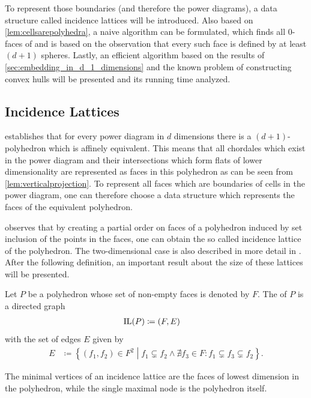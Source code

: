 To represent those boundaries (and therefore the power diagrams), a data structure called incidence lattices will be introduced.
Also based on \cref{lem:cellsarepolyhedra}, a naive algorithm can be formulated, which finds all $0$-faces of and is based on the observation that every such face is defined by at least $(d+1)$ spheres.
Lastly, an efficient algorithm based on the results of \cref{sec:embedding_in_d_1_dimensions} and the known problem of constructing convex hulls will be presented and its running time analyzed.

\subsection{Incidence Lattices}
\label{sub:incidence_lattices}
 establishes that for every power diagram in $d$ dimensions there is a $(d+1)$-polyhedron which is affinely equivalent.
This means that all chordales which exist in the power diagram and their intersections which form flats of lower dimensionality are represented as faces in this polyhedron as can be seen from \cref{lem:verticalprojection}.
To represent all faces which are boundaries of cells in the power diagram, one can therefore choose a data structure which represents the faces of the equivalent polyhedron.

\Textcite{grunbaum2003convex} observes that by creating a partial order on faces of a polyhedron induced by set inclusion of the points in the faces, one can obtain the so called incidence lattice of the polyhedron.
The two-dimensional case is also described in more detail in \cite{edelsbrunner1986constructing}.
After the following definition, an important result about the size of these lattices will be presented.

\begin{definition}
    \label{def:incidencelattice}
    Let $P$ be a polyhedron whose set of non-empty faces is denoted by $F$.
    The  of $P$ is a directed graph
    \begin{align}
        \operatorname{IL}(P) &\coloneqq (F, E)
    \end{align}
    with the set of edges $E$ given by
    \begin{align}
        E &\coloneqq \left\{ (f_1, f_2) \in F^2 \middle| f_1 \subsetneq f_2 \wedge \nexists f_3 \in F : f_1 \subsetneq f_3 \subsetneq f_2 \right\}.
    \end{align}
\end{definition}
The minimal vertices of an incidence lattice are the faces of lowest dimension in the polyhedron, while the single maximal node is the polyhedron itself.

